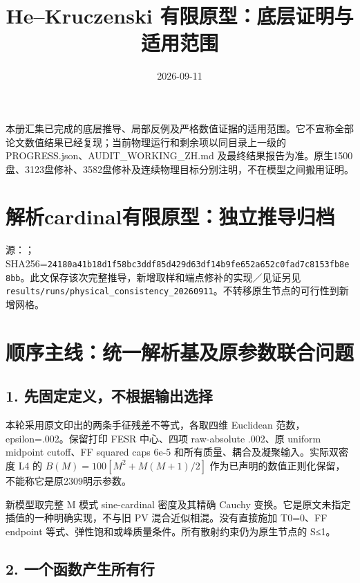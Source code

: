 \documentclass[
  10pt,
  a4paper,
]{article}
\title{He--Kruczenski 有限原型：底层证明与适用范围}
\author{}
\date{2026-09-11}
\begin{document}
\maketitle

{
\setcounter{tocdepth}{2}
\tableofcontents
}
本册汇集已完成的底层推导、局部反例及严格数值证据的适用范围。它不宣称全部论文数值结果已经复现；当前物理运行和剩余项以同目录上一级的
PROGRESS.json、AUDIT\_WORKING\_ZH.md
及最终结果报告为准。原生1500盘、3123盘修补、3582盘修补及连续物理目标分别注明，不在模型之间搬用证明。

\newpage

\section{解析cardinal有限原型：独立推导归档}\label{ux89e3ux6790cardinalux6709ux9650ux539fux578bux72ecux7acbux63a8ux5bfcux5f52ux6863}

源：；SHA256=\nolinkurl{24180a41b18d1f58bc3ddf85d429d63df14b9fe652a652c0fad7c8153fb8e8bb}。此文保存该次完整推导，新增取样和端点修补的实现／见证另见\texttt{results/runs/physical\_consistency\_20260911}。不转移原生节点的可行性到新增网格。

\section{顺序主线：统一解析基及原参数联合问题}\label{ux987aux5e8fux4e3bux7ebfux7edfux4e00ux89e3ux6790ux57faux53caux539fux53c2ux6570ux8054ux5408ux95eeux9898}

\subsection{1.
先固定定义，不根据输出选择}\label{ux5148ux56faux5b9aux5b9aux4e49ux4e0dux6839ux636eux8f93ux51faux9009ux62e9}

本轮采用原文印出的两条手征残差不等式，各取四维 Euclidean
范数，epsilon=.002。保留打印 FESR 中心、四项 raw-absolute .002、原
uniform midpoint cutoff、FF squared caps 6e-5
和所有质量、耦合及凝聚输入。实际双密度 L4 的 \(B(M)=100[M^2+M(M+1)/2]\)
作为已声明的数值正则化保留，不能称它是原2309明示参数。

新模型取完整 M 模式 sine-cardinal 密度及其精确 Cauchy
变换。它是原文未指定插值的一种明确实现，不与旧 PV
混合近似相混。没有直接施加 T0=0、FF endpoint
等式、弹性饱和或峰质量条件。所有散射约束仍为原生节点的
\textbar S\textbar≤1。

\subsection{2.
一个函数产生所有行}\label{ux4e00ux4e2aux51fdux6570ux4ea7ux751fux6240ux6709ux884c}
\end{document}
